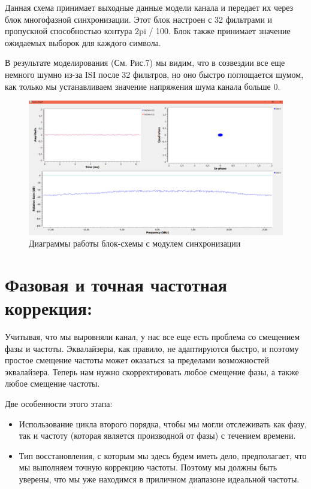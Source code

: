 \documentclass[12pt]{article}
\begin{document}
Данная схема принимает выходные данные модели канала и передает их через блок многофазной синхронизации. Этот блок настроен с 32 фильтрами и пропускной способностью контура 2pi / 100. Блок также принимает значение ожидаемых выборок для каждого символа.

В результате моделирования (См. Рис.7) мы видим, что в созвездии все еще немного шумно из-за ISI после 32 фильтров, но оно быстро поглощается шумом, как только мы устанавливаем значение напряжения шума канала больше 0.

\begin{figure}[H]
    \centering
    \includegraphics[width=1\textwidth]{pics/a0000-img007.png}
    \caption{Диаграммы работы блок-схемы с модулем синхронизации}
\end{figure}

\section{Фазовая и точная частотная коррекция:}

Учитывая, что мы выровняли канал, у нас все еще есть проблема со смещением фазы и частоты. Эквалайзеры, как правило, не адаптируются быстро, и поэтому простое смещение частоты может оказаться за пределами возможностей эквалайзера. Теперь нам нужно скорректировать любое смещение фазы, а также любое смещение частоты.

Две особенности этого этапа: 

\begin{itemize}
	\item Использование цикла второго порядка, чтобы мы могли отслеживать как фазу, так и частоту (которая является производной от фазы) с течением времени. 
	\item Тип восстановления, с которым мы здесь будем иметь дело, предполагает, что мы выполняем точную коррекцию частоты. Поэтому мы должны быть уверены, что мы уже находимся в приличном диапазоне идеальной частоты. 
\end{itemize}
\end{document}
